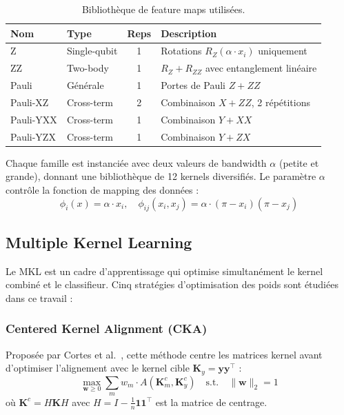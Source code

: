 \documentclass[12pt,a4paper]{article}
\newcommand{\K}{\mathbf{K}}
\newcommand{\w}{\mathbf{w}}
\begin{document}
\begin{table}[H]
\centering
\caption{Bibliothèque de feature maps utilisées.}
\label{tab:feature_maps}
\begin{tabular}{llcp{6cm}}
\toprule
\textbf{Nom} & \textbf{Type} & \textbf{Reps} & \textbf{Description} \\
\midrule
Z             & Single-qubit  & 1 & Rotations $R_Z(\alpha \cdot x_i)$ uniquement \\
ZZ            & Two-body      & 1 & $R_Z + R_{ZZ}$ avec entanglement linéaire \\
Pauli         & Générale      & 1 & Portes de Pauli $Z + ZZ$ \\
Pauli-XZ      & Cross-term    & 2 & Combinaison $X + ZZ$, 2 répétitions \\
Pauli-YXX     & Cross-term    & 1 & Combinaison $Y + XX$ \\
Pauli-YZX     & Cross-term    & 1 & Combinaison $Y + ZX$ \\
\bottomrule
\end{tabular}
\end{table}

Chaque famille est instanciée avec deux valeurs de bandwidth $\alpha$ (petite et grande), donnant une bibliothèque de 12 kernels diversifiés. Le paramètre $\alpha$ contrôle la fonction de mapping des données :
\begin{equation}
\phi_i(x) = \alpha \cdot x_i, \quad \phi_{ij}(x_i, x_j) = \alpha \cdot (\pi - x_i)(\pi - x_j)
\label{eq:data_map}
\end{equation}

\subsection{Multiple Kernel Learning}

Le MKL est un cadre d'apprentissage qui optimise simultanément le kernel combiné et le classifieur. Cinq stratégies d'optimisation des poids sont étudiées dans ce travail :

\subsubsection{Centered Kernel Alignment (CKA)}
Proposée par Cortes et al.~\cite{cortes2012}, cette méthode centre les matrices kernel avant d'optimiser l'alignement avec le kernel cible $\K_y = \mathbf{y}\mathbf{y}^\top$ :
\begin{equation}
\max_{\w \geq 0} \sum_m w_m \cdot A(\K_m^c, \K_y^c) \quad \text{s.t.} \quad \|\w\|_2 = 1
\label{eq:cka}
\end{equation}
où $\K^c = H\K H$ avec $H = I - \frac{1}{n}\mathbf{1}\mathbf{1}^\top$ est la matrice de centrage.
\end{document}
